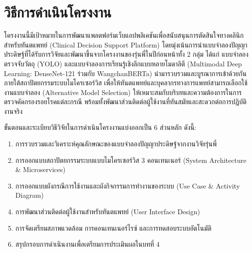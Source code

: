 
\chapter{วิธีการดำเนินโครงงาน}
\label{chapter:methodology}

โครงงานนี้มีเป้าหมายในการพัฒนาแพลตฟอร์มเว็บแอปพลิเคชันเพื่อสนับสนุนการตัดสินใจทางคลินิกสำหรับทันตแพทย์ (Clinical Decision Support Platform) โดยมุ่งเน้นการนำแบบจำลองปัญญาประดิษฐ์ที่ได้รับการวิจัยและพัฒนาขึ้นจากโครงงานของรุ่นพี่ในปีก่อนหน้าทั้ง 2 กลุ่ม ได้แก่ แบบจำลองตรวจจับวัตถุ (YOLO) และแบบจำลองการเรียนรู้เชิงลึกแบบหลายโมดาลิตี (Multimodal Deep Learning: DenseNet-121 ร่วมกับ WangchanBERTa) นำมารวบรวมและบูรณาการเข้าด้วยกันภายใต้สถาปัตยกรรมระบบไมโครเซอร์วิส เพื่อให้ทันตแพทย์และบุคลากรทางการแพทย์สามารถเลือกใช้งานแบบจำลอง (Alternative Model Selection) ให้เหมาะสมกับบริบทและความต้องการในการตรวจคัดกรองรอยโรคแต่ละกรณี พร้อมทั้งพัฒนาส่วนติดต่อผู้ใช้งานที่ทันสมัยและสะดวกต่อการปฏิบัติงานจริง

ขั้นตอนและระเบียบวิธีวิจัยในการดำเนินโครงงานแบ่งออกเป็น 6 ส่วนหลัก ดังนี้:
\begin{enumerate}
    \item การรวบรวมและวิเคราะห์คุณลักษณะของแบบจำลองปัญญาประดิษฐ์จากงานวิจัยรุ่นพี่
    \item การออกแบบสถาปัตยกรรมระบบแบบไมโครเซอร์วิส 3 คอนเทนเนอร์ (System Architecture \& Microservices)
    \item การออกแบบผังกรณีการใช้งานและผังกิจกรรมการทำงานของระบบ (Use Case \& Activity Diagram)
    \item การพัฒนาส่วนติดต่อผู้ใช้งานสำหรับทันตแพทย์ (User Interface Design)
    \item การจัดเตรียมสภาพแวดล้อม การคอนเทนเนอร์ไรซ์ และการทดสอบระบบอัตโนมัติ
    \item สรุปกรอบการดำเนินงานเพื่อเตรียมการประเมินผลในบทที่ 4
\end{enumerate}

